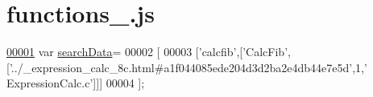 \hypertarget{functions__0_8js_source}{\section{functions\+\_.\+js}
\label{functions__0_8js_source}
}

\begin{DoxyCode}
\hypertarget{functions__0_8js_source_l00001}{}\hyperlink{functions__0_8js_ad01a7523f103d6242ef9b0451861231e}{00001} var \hyperlink{functions__0_8js_ad01a7523f103d6242ef9b0451861231e}{searchData}=
00002 [
00003   [\textcolor{stringliteral}{'calcfib'},[\textcolor{stringliteral}{'CalcFib'},[\textcolor{stringliteral}{'../\_expression\_calc\_8c.html#a1f044085ede204d3d2ba2e4db44e7e5d'},1,\textcolor{stringliteral}{'
      ExpressionCalc.c'}]]]
00004 ];
\end{DoxyCode}
